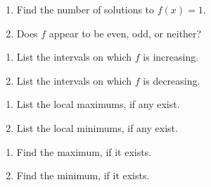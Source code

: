 {\begin{multicols}{2}
\begin{enumerate}
\setcounter{HW}{\value{enumi}}
\end{enumerate}
\end{multicols}


\begin{multicols}{2}
\begin{enumerate}
\setcounter{enumi}{\value{HW}}

\item  Find the number of solutions to $f(x) = 1$.

\item  Does $f$ appear to be even, odd, or neither?

\setcounter{HW}{\value{enumi}}
\end{enumerate}
\end{multicols}


\begin{multicols}{2}
\begin{enumerate}
\setcounter{enumi}{\value{HW}}

\item  List the intervals on which $f$ is increasing.

\item  List the intervals on which $f$ is decreasing.

\setcounter{HW}{\value{enumi}}
\end{enumerate}
\end{multicols}

\begin{multicols}{2}
\begin{enumerate}
\setcounter{enumi}{\value{HW}}

\item  List the local maximums, if any exist.

\item  List the local minimums, if any exist.

\setcounter{HW}{\value{enumi}}
\end{enumerate}
\end{multicols}

\begin{multicols}{2}
\begin{enumerate}
\setcounter{enumi}{\value{HW}}

\item  Find the maximum, if it exists.

\item  Find the minimum, if it exists.

\setcounter{HW}{\value{enumi}}
\end{enumerate}
\end{multicols}
}
